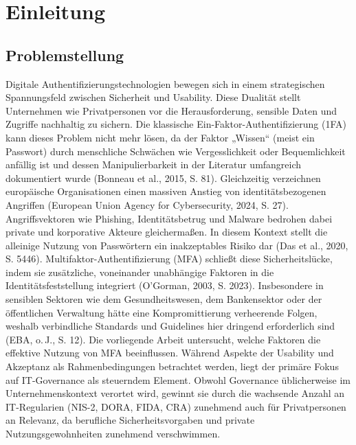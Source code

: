 \section{Einleitung}


\subsection{Problemstellung}
Digitale Authentifizierungstechnologien bewegen sich in einem strategischen Spannungsfeld zwischen Sicherheit und Usability. Diese Dualität stellt Unternehmen wie Privatpersonen vor die Herausforderung, sensible Daten und Zugriffe nachhaltig zu sichern.
Die klassische Ein-Faktor-Authentifizierung (1FA) kann dieses Problem nicht mehr lösen, da der Faktor „Wissen“ (meist ein Passwort) durch menschliche Schwächen wie Vergesslichkeit oder Bequemlichkeit anfällig ist und dessen Manipulierbarkeit in der Literatur umfangreich dokumentiert wurde (Bonneau et al., 2015, S. 81).
Gleichzeitig verzeichnen europäische Organisationen einen massiven Anstieg von identitätsbezogenen Angriffen (European Union Agency for Cybersecurity, 2024, S. 27). Angriffsvektoren wie Phishing, Identitätsbetrug und Malware bedrohen dabei private und korporative Akteure gleichermaßen.
In diesem Kontext stellt die alleinige Nutzung von Passwörtern ein inakzeptables Risiko dar (Das et al., 2020, S. 5446).
Multifaktor-Authentifizierung (MFA) schließt diese Sicherheitslücke, indem sie zusätzliche, voneinander unabhängige Faktoren in die Identitätsfeststellung integriert (O’Gorman, 2003, S. 2023).
Insbesondere in sensiblen Sektoren wie dem Gesundheitswesen, dem Bankensektor oder der öffentlichen Verwaltung hätte eine Kompromittierung verheerende Folgen, weshalb verbindliche Standards und Guidelines hier dringend erforderlich sind (EBA, o.\,J., S. 12).
Die vorliegende Arbeit untersucht, welche Faktoren die effektive Nutzung von MFA beeinflussen.
Während Aspekte der Usability und Akzeptanz als Rahmenbedingungen betrachtet werden, liegt der primäre Fokus auf IT-Governance als steuerndem Element. Obwohl Governance üblicherweise im Unternehmenskontext verortet wird, gewinnt sie durch die wachsende Anzahl an IT-Regularien (NIS-2, DORA, FIDA, CRA) zunehmend auch für Privatpersonen an Relevanz, da berufliche Sicherheitsvorgaben und private Nutzungsgewohnheiten zunehmend verschwimmen.

